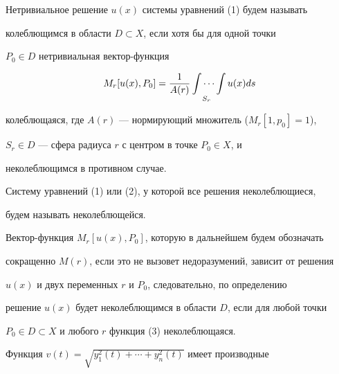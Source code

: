 \begin{defn} 


Нетривиальное решение $u(x)$ системы уравнений (1) будем называть 


колеблющимся в области $D\subset X$, если хотя бы для одной точки 


$P_0\in D$ нетривиальная вектор-функция 


\begin{equation} 


M_r[u(x),P_0]=\frac{1}{A(r)}\idotsint\limits_{S_r} 


u(x)ds 


\end{equation} 


колеблющаяся, где $A(r)$ --- нормирующий множитель ($M_r[1,p_0]=1$), 


$S_r\in D$ --- сфера радиуса $r$ с центром в точке $P_0\in X$, и 


неколеблющимся в противном случае. 


\end{defn} 





\begin{defn}


Систему уравнений (1) или (2), у которой все решения неколеблющиеся,


будем называть неколеблющейся.


\end{defn}


 


\begin{note} 


Вектор-функция $M_r[u(x),P_0]$, которую в дальнейшем будем обозначать 


сокращенно $M(r)$, если это не вызовет недоразумений, зависит от решения 


$u(x)$ и двух переменных $r$ и $P_0$, следовательно, по определению 


решение $u(x)$ будет неколеблющимся в области $D$, если для любой точки 


$P_0\in D\subset X$ и любого $r$ функция (3) неколеблющаяся. 


\end{note} 


 


Функция $v(t)=\sqrt{y^2_1(t)+\dotsb+y^2_n(t)}$ имеет производные 



